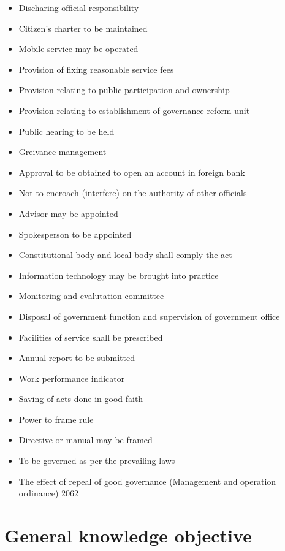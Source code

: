 \documentclass[
  openany]{book}
\providecommand{\tightlist}{%
  \setlength{\itemsep}{0pt}\setlength{\parskip}{0pt}}
\begin{document}
\begin{itemize}
\tightlist
\item
  Discharing official responsibility
\item
  Citizen's charter to be maintained
\item
  Mobile service may be operated
\item
  Provision of fixing reasonable service fees
\item
  Provision relating to public participation and ownership
\item
  Provision relating to establishment of governance reform unit
\item
  Public hearing to be held
\item
  Greivance management
\item
  Approval to be obtained to open an account in foreign bank
\item
  Not to encroach (interfere) on the authority of other officials
\item
  Advisor may be appointed
\item
  Spokesperson to be appointed
\item
  Constitutional body and local body shall comply the act
\item
  Information technology may be brought into practice
\item
  Monitoring and evalutation committee
\item
  Disposal of government function and supervision of government office
\item
  Facilities of service shall be prescribed
\item
  Annual report to be submitted
\item
  Work performance indicator
\item
  Saving of acts done in good faith
\item
  Power to frame rule
\item
  Directive or manual may be framed
\item
  To be governed as per the prevailing laws
\item
  The effect of repeal of good governance (Management and operation ordinance) 2062
\end{itemize}

\hypertarget{general-knowledge-objective}{%
\chapter{General knowledge objective}\label{general-knowledge-objective}}
\end{document}
